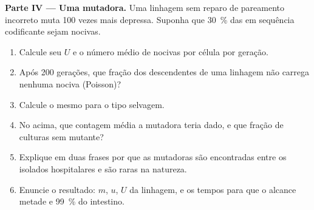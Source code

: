 \begin{problem}
\medskip
\noindent\textbf{Parte IV --- Uma mutadora.}
Uma linhagem sem reparo de pareamento incorreto muta \num{100} vezes
mais depressa. Suponha que \qty{30}{\%} das  em sequência
codificante sejam nocivas.
\begin{enumerate}[resume]
  \item Calcule seu $U$ e o número médio de  nocivas por
        célula por geração.
  \item Após \num{200} gerações, que fração dos descendentes de uma
        linhagem não carrega nenhuma  nociva (Poisson)?
  \item Calcule o mesmo para o tipo selvagem.
  \item No  acima, que contagem média a mutadora
        teria dado, e que fração de culturas sem mutante?
  \item Explique em duas frases por que as mutadoras são encontradas
        entre os isolados hospitalares e são raras na natureza.
  \item Enuncie o resultado: $m$, $u$, $U$ da linhagem, e os tempos
        para que o  alcance metade e \qty{99}{\%} do
        intestino.
\end{enumerate}
\end{problem}
